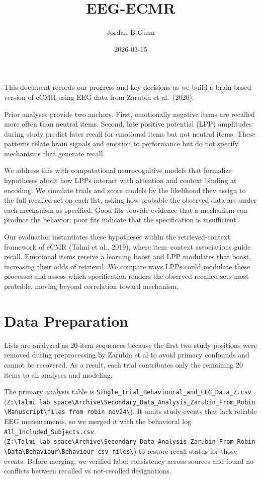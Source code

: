\documentclass[
  man,
  longtable,
  nolmodern,
  notxfonts,
  notimes,
  draftfirst,
  colorlinks=true,linkcolor=blue,citecolor=blue,urlcolor=blue]{apa7}
\title{EEG-ECMR}
\author{Jordan B Gunn}
\affiliation{
{Department of Psychology, University of Cambridge}}
\date{2026-03-15}
\begin{document}
\maketitle


\setcounter{secnumdepth}{5}

\setlength\LTleft{0pt}


This document records our progress and key decisions as we build a
brain-based version of eCMR using EEG data from Zarubin et al.~(2020).

Prior analyses provide two anchors. First, emotionally negative items
are recalled more often than neutral items. Second, late positive
potential (LPP) amplitudes during study predict later recall for
emotional items but not neutral items. These patterns relate brain
signals and emotion to performance but do not specify mechanisms that
generate recall.

We address this with computational neurocognitive models that formalize
hypotheses about how LPPs interact with attention and context binding at
encoding. We simulate trials and score models by the likelihood they
assign to the full recalled set on each list, asking how probable the
observed data are under each mechanism as specified. Good fits provide
evidence that a mechanism can produce the behavior; poor fits indicate
that the specification is insufficient.

Our evaluation instantiates these hypotheses within the
retrieved-context framework of eCMR (Talmi et al., 2019), where
item--context associations guide recall. Emotional items receive a
learning boost and LPP modulates that boost, increasing their odds of
retrieval. We compare ways LPPs could modulate these processes and
assess which specification renders the observed recalled sets most
probable, moving beyond correlation toward mechanism.

\section{Data Preparation}\label{data-preparation}

Lists are analyzed as 20‑item sequences because the first two study
positions were removed during preprocessing by Zarubin et al to avoid
primacy confounds and cannot be recovered. As a result, each trial
contributes only the remaining 20 items to all analyses and modeling.

The primary analysis table is
\texttt{Single\_Trial\_Behavioural\_and\_EEG\_Data\_Z.csv}
(\texttt{Z:\textbackslash{}Talmi\ lab\ space\textbackslash{}Archive\textbackslash{}Secondary\_Data\_Analysis\_Zarubin\_From\_Robin\textbackslash{}Manuscript\textbackslash{}files\ from\ robin\ nov24\textbackslash{}}).
It omits study events that lack reliable EEG measurements, so we merged
it with the behavioral log \texttt{All\_Included\_Subjects.csv}
(\texttt{Z:\textbackslash{}Talmi\ lab\ space\textbackslash{}Archive\textbackslash{}Secondary\_Data\_Analysis\_Zarubin\_From\_Robin\textbackslash{}Data\textbackslash{}Behaviour\textbackslash{}Behaviour\_csv\_files\textbackslash{}})
to restore recall status for those events. Before merging, we verified
label consistency across sources and found no conflicts between recalled
vs not‑recalled designations.
\end{document}
